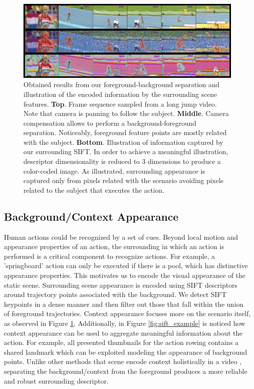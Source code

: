 \begin{figure}[t!]
\begin{center}
\includegraphics[width=0.98\linewidth]{fig/approach.png}
\end{center}
\caption{Obtained results from our foreground-background separation and illustration of the encoded information by the surrounding scene features. \textbf{Top}. Frame sequence sampled from a long jump video. Note that camera is panning to follow the subject. \textbf{Middle}. Camera compensation allows to perform a background-foreground separation. Noticeably, foreground feature points are mostly related with the subject. \textbf{Bottom}. Illustration of information captured by our surrounding SIFT. In order to achieve a meaningful illustration, descriptor dimensionality is reduced to 3 dimensions to produce a color-coded image. As illustrated, surrounding appearance is captured only from pixels related with the scenario \ie avoiding pixels related to the subject that executes the action.}
\label{fig:approach}
\end{figure}


\subsection{Background/Context Appearance}
Human actions could be recognized by a set of cues. Beyond local motion and appearance properties of an action, the surrounding in which an action is performed is a critical component to recognize actions. For example, a 'springboard' action can only be executed if there is a pool, which has distinctive appearance properties. This motivates us to encode the visual appearance of the static scene. Surrounding scene appearance is encoded using SIFT descriptors \cite{lowe2004} around trajectory points associated with the background. We detect SIFT keypoints in a dense manner and then filter out those that fall within the union of foreground trajectories. Context appearance focuses more on the scenario itself, as observed in Figure \ref{fig:approach}. Additionally, in Figure \ref{fig:sift_example} is noticed how context appearance can be used to aggregate meaningful information about the action. For example, all presented thumbnails for the action rowing contains a shared landmark which can be exploited modeling the appearance of background points.  Unlike other methods that scene encode context holistically in a video \cite{marszalek2009}, separating the background/context from the foreground produces a more reliable and robust surrounding descriptor.

